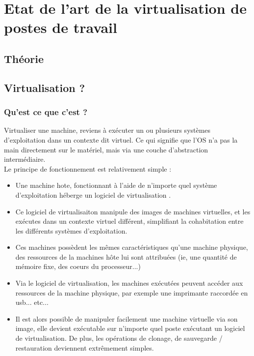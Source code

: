 \section{Etat de l'art de la virtualisation de postes de travail}

\subsection{Théorie}

\subsection{Virtualisation ?}

\subsubsection{Qu'est ce que c'est ?}

Virtualiser une machine, reviens à exécuter un ou plusieurs systèmes d'exploitation dans un contexte dit virtuel. Ce qui signifie que l'OS n'a pas la main directement sur le matériel, mais via une couche d'abstraction intermédiaire.\\ 

Le principe de fonctionnement est relativement simple : \\
\begin{itemize}
\item  Une machine hote, fonctionnant à l'aide de n'importe quel système d'exploitation héberge un logiciel de virtualisation .
\item Ce logiciel de virtualisaiton manipule des images de machines virtuelles, et les exécutes dans un contexte virtuel différent, simplifiant la cohabitation entre les différents systèmes d'exploitation.
\item Ces machines possèdent les mêmes caractéristiques qu'une machine physique, des ressources de la machines hôte lui sont attribuées (ie, une quantité de mémoire fixe,  des coeurs du processeur...)
\item Via le logiciel de virtualisation, les machines exécutées peuvent accéder aux ressources de la machine physique, par exemple une imprimante raccordée en usb... etc...
\item Il est alors possible de manipuler facilement une machine virtuelle via son image, elle devient exécutable sur n'importe quel poste exécutant un logiciel de virtualisation. De plus, les opérations de clonage, de sauvegarde / restauration deviennent extrêmement simples.
\end{itemize}

